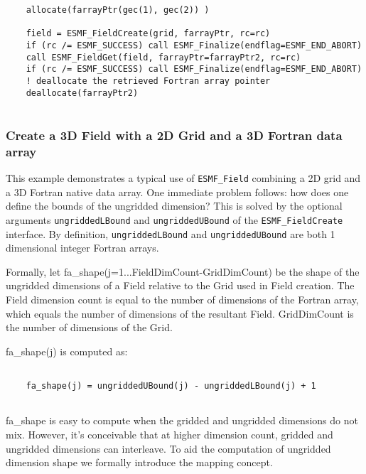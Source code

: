  \begin{verbatim}
    allocate(farrayPtr(gec(1), gec(2)) )

    field = ESMF_FieldCreate(grid, farrayPtr, rc=rc)
    if (rc /= ESMF_SUCCESS) call ESMF_Finalize(endflag=ESMF_END_ABORT)
    call ESMF_FieldGet(field, farrayPtr=farrayPtr2, rc=rc)
    if (rc /= ESMF_SUCCESS) call ESMF_Finalize(endflag=ESMF_END_ABORT)
    ! deallocate the retrieved Fortran array pointer
    deallocate(farrayPtr2)
 
\end{verbatim}
 

  \subsubsection{Create a 3D Field with a 2D Grid and a 3D Fortran data array}
  \label{sec:field:usage:create_2dgrid_3dptr}
  
    This example demonstrates a typical use of {\tt ESMF\_Field} combining
    a 2D grid and a 3D Fortran native data array. One immediate problem follows: 
    how does one define the bounds of the ungridded dimension? This is
    solved by the optional arguments {\tt ungriddedLBound} and {\tt ungriddedUBound}
    of the {\tt ESMF\_FieldCreate} interface. By definition, {\tt ungriddedLBound}
    and {\tt ungriddedUBound}
    are both 1 dimensional integer Fortran arrays.
  
    Formally, let fa\_shape(j=1...FieldDimCount-GridDimCount) be the shape of the
    ungridded dimensions of a Field relative to the Grid used in Field creation.
    The Field dimension count is equal to the number of dimensions of the Fortran array, which
    equals the number of dimensions of the resultant Field. GridDimCount is
    the number of dimensions of the Grid. 
   
    fa\_shape(j) is computed as:
    \begin{verbatim}
   
    fa_shape(j) = ungriddedUBound(j) - ungriddedLBound(j) + 1
   
    \end{verbatim}
    
    fa\_shape is easy to compute when the gridded and ungridded dimensions do not
    mix. However, it's conceivable that at higher dimension count, gridded and ungridded
    dimensions can interleave. To aid the computation of ungridded dimension shape
    we formally introduce the mapping concept.
  
